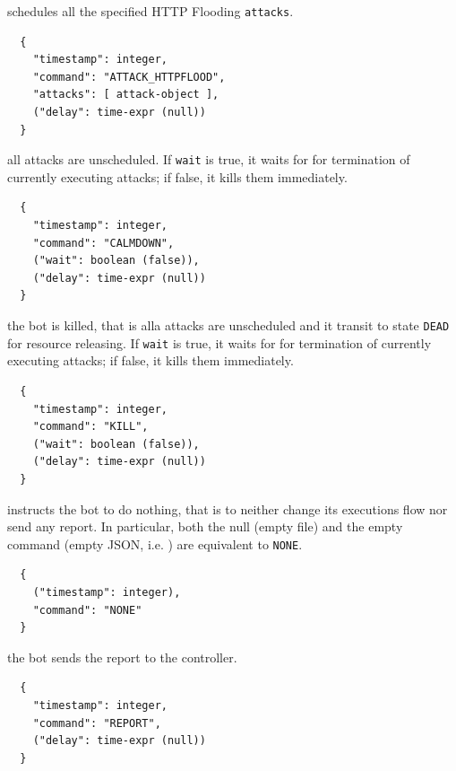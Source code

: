 \begin{description}
  \setlength\itemsep{1em}

  \item[ATTACK-HTTPFLOOD] schedules all the specified HTTP Flooding \texttt{attacks}.

  \begin{verbatim}
  {
    "timestamp": integer,
    "command": "ATTACK_HTTPFLOOD",
    "attacks": [ attack-object ],
    ("delay": time-expr (null))
  }
  \end{verbatim}

  \item[CALMDOWN] all attacks are unscheduled.
  If \texttt{wait} is true, it waits for for termination of currently executing attacks; if false, it kills them immediately.

  \begin{verbatim}
  {
    "timestamp": integer,
    "command": "CALMDOWN",
    ("wait": boolean (false)),
    ("delay": time-expr (null))
  }
  \end{verbatim}

  \item[KILL] the bot is killed, that is alla attacks are unscheduled and it transit to state \texttt{DEAD} for resource releasing.
  If \texttt{wait} is true, it waits for for termination of currently executing attacks; if false, it kills them immediately.

  \begin{verbatim}
  {
    "timestamp": integer,
    "command": "KILL",
    ("wait": boolean (false)),
    ("delay": time-expr (null))
  }
  \end{verbatim}

  \item[NONE] instructs the bot to do nothing, that is to neither change its executions flow nor send any report. In particular, both the null (empty file) and the empty command (empty JSON, i.e. {}) are equivalent to \texttt{NONE}.

  \begin{verbatim}
  {
    ("timestamp": integer),
    "command": "NONE"
  }
  \end{verbatim}

  \item[REPORT] the bot sends the report to the controller.

  \begin{verbatim}
  {
    "timestamp": integer,
    "command": "REPORT",
    ("delay": time-expr (null))
  }
  \end{verbatim}


\end{description}
